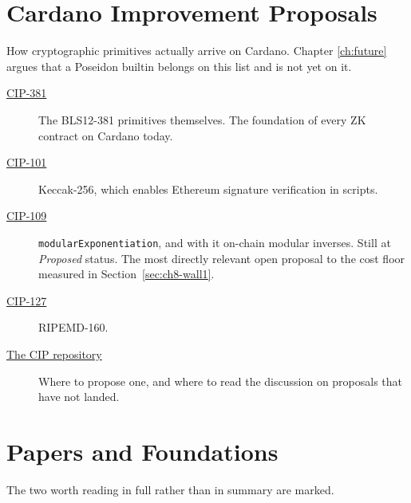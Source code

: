 \section{Cardano Improvement Proposals} \label{sec:sito-cips}

How cryptographic primitives actually arrive on Cardano. Chapter
\ref{ch:future} argues that a Poseidon builtin belongs on this list and is not
yet on it.

\begin{description}
  \item[\href{https://cips.cardano.org/cip/CIP-0381}{CIP-381}]
    The BLS12-381 primitives themselves. The foundation of every ZK contract
    on Cardano today.

  \item[\href{https://cips.cardano.org/cip/CIP-0101}{CIP-101}]
    Keccak-256, which enables Ethereum signature verification in scripts.

  \item[\href{https://cips.cardano.org/cip/CIP-0109}{CIP-109}]
    \texttt{modularExponentiation}, and with it on-chain modular inverses.
    Still at \emph{Proposed} status. The most directly relevant open proposal
    to the cost floor measured in Section~\ref{sec:ch8-wall1}.

  \item[\href{https://cips.cardano.org/cip/CIP-0127}{CIP-127}]
    RIPEMD-160.

  \item[\href{https://github.com/cardano-foundation/CIPs}{The CIP repository}]
    Where to propose one, and where to read the discussion on proposals that
    have not landed.
\end{description}

\section{Papers and Foundations} \label{sec:sito-papers}

The two worth reading in full rather than in summary are marked.

